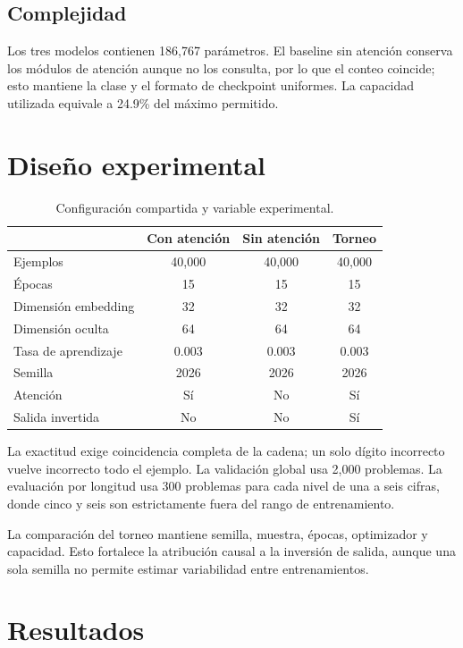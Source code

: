 \documentclass[11pt,letterpaper]{article}
\begin{document}
\subsection{Complejidad}

Los tres modelos contienen 186,767 parámetros. El baseline sin atención conserva los módulos de atención
aunque no los consulta, por lo que el conteo coincide; esto mantiene la clase y el formato de checkpoint
uniformes. La capacidad utilizada equivale a 24.9\% del máximo permitido.

\section{Diseño experimental}

\begin{table}[H]\centering
\caption{Configuración compartida y variable experimental.}
\begin{tabular}{lccc}
\toprule & Con atención & Sin atención & Torneo \\
\midrule
Ejemplos & 40,000 & 40,000 & 40,000 \\
Épocas & 15 & 15 & 15 \\
Dimensión embedding & 32 & 32 & 32 \\
Dimensión oculta & 64 & 64 & 64 \\
Tasa de aprendizaje & 0.003 & 0.003 & 0.003 \\
Semilla & 2026 & 2026 & 2026 \\
Atención & Sí & No & Sí \\
Salida invertida & No & No & Sí \\
\bottomrule
\end{tabular}
\end{table}

La exactitud exige coincidencia completa de la cadena; un solo dígito incorrecto vuelve incorrecto todo el
ejemplo. La validación global usa 2,000 problemas. La evaluación por longitud usa 300 problemas para cada
nivel de una a seis cifras, donde cinco y seis son estrictamente fuera del rango de entrenamiento.

La comparación del torneo mantiene semilla, muestra, épocas, optimizador y capacidad. Esto fortalece la
atribución causal a la inversión de salida, aunque una sola semilla no permite estimar variabilidad entre
entrenamientos.

\clearpage
\section{Resultados}
\end{document}
